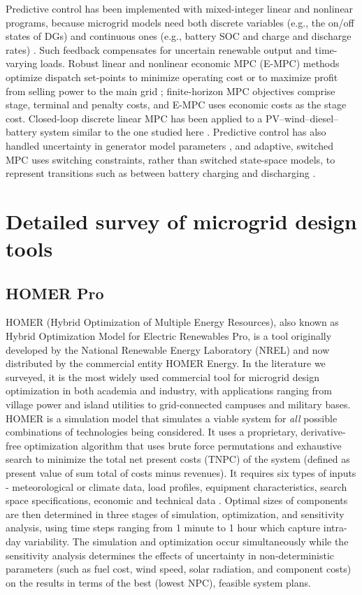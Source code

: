 \documentclass[final,3p,times]{elsarticle}
\begin{document}
Predictive control has been implemented with mixed-integer linear and nonlinear programs, because microgrid models need both discrete variables (e.g., the on/off states of DGs) and continuous ones (e.g., battery SOC and charge and discharge rates) \cite{parisio2013, parisio2014}. Such feedback compensates for uncertain renewable output and time-varying loads. Robust linear and nonlinear economic MPC (E-MPC) methods optimize dispatch set-points to minimize operating cost \cite{zachar2016} or to maximize profit from selling power to the main grid \cite{pereira2017}; finite-horizon MPC objectives comprise stage, terminal and penalty costs, and E-MPC uses economic costs as the stage cost. Closed-loop discrete linear MPC has been applied to a PV--wind--diesel--battery system similar to the one studied here \cite{tazvinga2014}. Predictive control has also handled uncertainty in generator model parameters \cite{prodan2014}, and adaptive, switched MPC uses switching constraints, rather than switched state-space models, to represent transitions such as between battery charging and discharging \cite{zhu2015}.


\section{Detailed survey of microgrid design tools \label{app:tools}}

\subsection{HOMER Pro}

HOMER (Hybrid Optimization of Multiple Energy Resources), also known as Hybrid Optimization Model for Electric Renewables Pro, is a tool originally developed by the National Renewable Energy Laboratory (NREL) and now distributed by the commercial entity HOMER Energy. In the literature we surveyed, it is the most widely used commercial tool for microgrid design optimization in both academia and industry, with applications ranging from village power and island utilities to grid-connected campuses and military bases. HOMER is a simulation model that simulates a viable system for \textit{all} possible combinations of technologies being considered. It uses a proprietary, derivative-free optimization algorithm that uses brute force permutations and exhaustive search \cite{weng2016} to minimize the total net present costs (TNPC) of the system (defined as present value of sum total of costs minus revenues). It requires six types of inputs - meteorological or climate data, load profiles, equipment characteristics, search space specifications, economic and technical data \cite{bahramara2016}. Optimal sizes of components are then determined in three stages of simulation, optimization, and sensitivity analysis, using time steps ranging from 1 minute to 1 hour which capture intra-day variability. The simulation and optimization occur simultaneously while the sensitivity analysis determines the effects of uncertainty in non-deterministic parameters (such as fuel cost, wind speed, solar radiation, and component costs) on the results in terms of the best (lowest NPC), feasible system plans.
\end{document}
